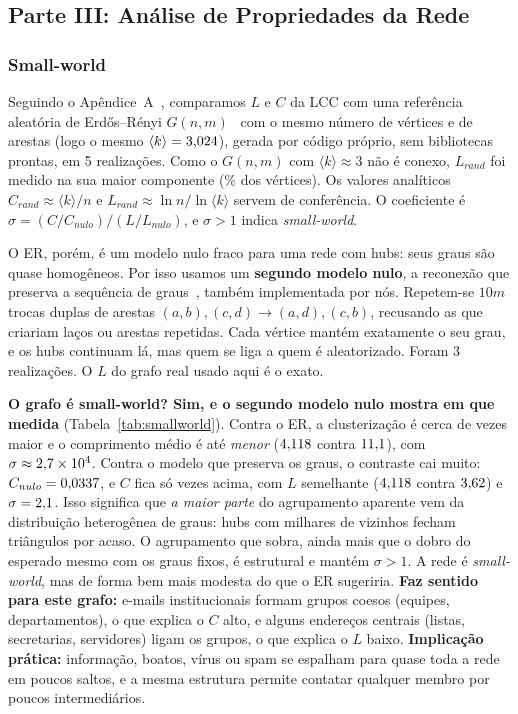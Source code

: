 \documentclass[sigconf]{webmedia}
\begin{document}
\subsection{Parte III: Análise de Propriedades da Rede}

\subsubsection{Small-world}
Seguindo o Apêndice~A~\cite{watts1998,humphries2008}, comparamos $L$ e $C$ da LCC com
uma referência aleatória de Erd\H{o}s--Rényi $G(n,m)$~\cite{erdos1959} com o mesmo número de
vértices e de arestas (logo o mesmo $\langle k \rangle = 3{,}024$), gerada por código
próprio, sem bibliotecas prontas, em 5 realizações. Como o $G(n,m)$ com
$\langle k\rangle\approx3$ não é conexo, $L_{rand}$ foi medido na sua maior componente
(\pctGiganteER\% dos vértices). Os valores analíticos
$C_{rand}\approx\langle k\rangle/n$ e $L_{rand}\approx\ln n/\ln\langle k\rangle$ servem
de conferência. O coeficiente é $\sigma = (C/C_{nulo})/(L/L_{nulo})$, e $\sigma > 1$
indica \emph{small-world}.

O ER, porém, é um modelo nulo fraco para uma rede com hubs: seus graus são quase
homogêneos. Por isso usamos um \textbf{segundo modelo nulo}, a reconexão que preserva a
sequência de graus~\cite{maslov2002}, também implementada por nós. Repetem-se $10m$
trocas duplas de arestas $(a,b),(c,d) \to (a,d),(c,b)$, recusando as que criariam laços ou
arestas repetidas. Cada vértice mantém exatamente o seu grau, e os hubs continuam lá,
mas quem se liga a quem é aleatorizado. Foram 3 realizações. O $L$ do grafo real usado
aqui é o exato.



\textbf{O grafo é small-world? Sim, e o segundo modelo nulo mostra em que medida}
(Tabela~\ref{tab:smallworld}). Contra o ER, a clusterização é cerca de \CsobreCr{} vezes
maior e o comprimento médio é até \emph{menor} ($4{,}118$ contra $11{,}1$), com
$\sigma\approx2{,}7\times10^{4}$. Contra o modelo que preserva os graus, o contraste cai muito:
$C_{nulo}=0{,}0337$, e $C$ fica só \CsobreCconf{} vezes acima, com $L$ semelhante
($4{,}118$ contra $3{,}62$) e $\sigma=2{,}1$. Isso significa que \emph{a maior parte}
do agrupamento aparente vem da distribuição heterogênea de graus: hubs com milhares de
vizinhos fecham triângulos por acaso. O agrupamento que sobra, ainda mais que o dobro do
esperado mesmo com os graus fixos, é estrutural e mantém $\sigma>1$. A rede é
\emph{small-world}, mas de forma bem mais modesta do que o ER sugeriria.
\textbf{Faz sentido para este grafo:} e-mails institucionais formam grupos coesos
(equipes, departamentos), o que explica o $C$ alto, e alguns endereços centrais (listas,
secretarias, servidores) ligam os grupos, o que explica o $L$ baixo. \textbf{Implicação
prática:} informação, boatos, vírus ou spam se espalham para quase toda a rede em
poucos saltos, e a mesma estrutura permite contatar qualquer membro por poucos
intermediários.
\end{document}

